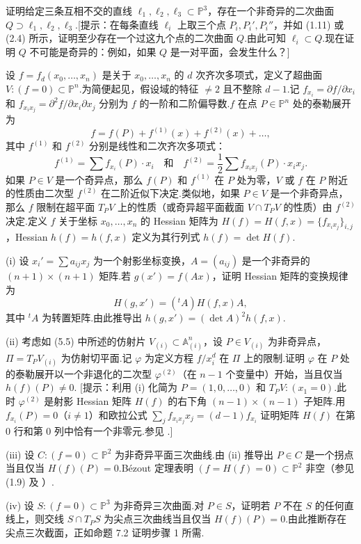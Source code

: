\begin{exercise}
证明给定三条互相不交的直线 \(\ell_1, \ell_2, \ell_3 \subset {\mathbb{P}}^{3}\)，存在一个非奇异的二次曲面 \(Q \supset \ell_1, \ell_2, \ell_3\).[提示：在每条直线 \(\ell_i\) 上取三个点 \(P_i, P_i', P_i''\)，并如 (1.11) 或 (2.4) 所示，证明至少存在一个过这九个点的二次曲面 \(Q\).由此可知 \(\ell_i \subset Q\).现在证明 \(Q\) 不可能是奇异的：例如，如果 \(Q\) 是一对平面，会发生什么？]
\end{exercise}

\begin{exercise}[Hessian 矩阵]
设 \(f = f_d(x_0, \dots, x_n)\) 是关于 \(x_0, \dots, x_n\) 的 \(d\) 次齐次多项式，定义了超曲面 \(V: (f=0) \subset {\mathbb{P}}^{n}\).为简便起见，假设域的特征 \(\neq 2\) 且不整除 \(d-1\).记 \(f_{x_i} = \partial f/\partial x_i\) 和 \(f_{x_ix_j} = \partial^2 f/\partial x_i \partial x_j\) 分别为 \(f\) 的一阶和二阶偏导数.\(f\) 在点 \(P \in {\mathbb{P}}^{n}\) 处的泰勒展开为
\[
f = f(P) + f^{(1)}(x) + f^{(2)}(x) + \dots,
\]
其中 \(f^{(1)}\) 和 \(f^{(2)}\) 分别是线性和二次齐次多项式：
\[
f^{(1)} = \sum f_{x_i}(P) \cdot x_i \quad \text{和} \quad f^{(2)} = \frac{1}{2} \sum f_{x_ix_j}(P) \cdot x_i x_j.
\]
如果 \(P \in V\) 是一个奇异点，那么 \(f(P)\) 和 \(f^{(1)}\) 在 \(P\) 处为零，\(V\) 或 \(f\) 在 \(P\) 附近的性质由二次型 \(f^{(2)}\) 在二阶近似下决定.类似地，如果 \(P \in V\) 是一个非奇异点，那么 \(f\) 限制在超平面 \(T_PV\) 上的性质（或奇异超平面截面 \(V \cap T_PV\) 的性质）由 \(f^{(2)}\) 决定.定义 \(f\) 关于坐标 \(x_0, \dots, x_n\) 的 Hessian 矩阵为 \(H(f) = H(f,x) = \{f_{x_ix_j}\}_{i,j}\)，Hessian \(h(f) = h(f,x)\) 定义为其行列式 \(h(f) = \det H(f)\).

(i) 设 \(x_i' = \sum a_{ij}x_j\) 为一个射影坐标变换，\(A = (a_{ij})\) 是一个非奇异的 \((n+1) \times (n+1)\) 矩阵.若 \(g(x') = f(Ax)\)，证明 Hessian 矩阵的变换规律为
\[
H(g,x') = ({}^tA) H(f,x) A,
\]
其中 \({}^tA\) 为转置矩阵.由此推导出 \(h(g,x') = (\det A)^2 h(f,x)\).

(ii) 考虑如 (5.5) 中所述的仿射片 \(V_{(i)} \subset {\mathbb{A}}_{(i)}^{n}\)，设 \(P \in V_{(i)}\) 为非奇异点，\(\Pi = T_P V_{(i)}\) 为仿射切平面.记 \(\varphi\) 为定义方程 \(f/x_i^d\) 在 \(\Pi\) 上的限制.证明 \(\varphi\) 在 \(P\) 处的泰勒展开以一个非退化的二次型 \(\varphi^{(2)}\)（在 \(n-1\) 个变量中）开始，当且仅当 \(h(f)(P) \neq 0\).
[提示：利用 (i) 化简为 \(P=(1,0,\dots,0)\) 和 \(T_PV: (x_1=0)\).此时 \(\varphi^{(2)}\) 是射影 Hessian 矩阵 \(H(f)\) 的右下角 \((n-1) \times (n-1)\) 子矩阵.用 \(f_{x_i}(P)=0\)（\(i \neq 1\)）和欧拉公式 \(\sum_j f_{x_ix_j} x_j = (d-1)f_{x_i}\) 证明矩阵 \(H(f)\) 在第 0 行和第 0 列中恰有一个非零元.参见 \cite[p. 116]{Fulton_AlgebraicCurves}.]

(iii) 设 \(C: (f=0) \subset {\mathbb{P}}^{2}\) 为非奇异平面三次曲线.由 (ii) 推导出 \(P \in C\) 是一个拐点当且仅当 \(H(f)(P)=0\).Bézout 定理表明 \((f=H(f)=0) \subset {\mathbb{P}}^{2}\) 非空（参见 (1.9) 及 \cite[p. 112]{Fulton_AlgebraicCurves}）.

(iv) 设 \(S: (f=0) \subset {\mathbb{P}}^{3}\) 为非奇异三次曲面.对 \(P \in S\)，证明若 \(P\) 不在 \(S\) 的任何直线上，则交线 \(S \cap T_PS\) 为尖点三次曲线当且仅当 \(H(f)(P)=0\).由此推断存在尖点三次截面，正如命题 7.2 证明步骤 1 所需.
\end{exercise}

